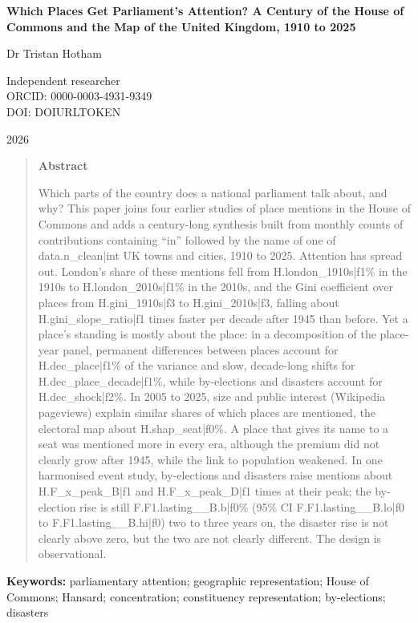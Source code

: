 \documentclass[11pt,a4paper]{article}
\begin{document}
\begin{center}
{\Large\bfseries Which Places Get Parliament's Attention? A Century of the House of Commons and the Map of the United Kingdom, 1910 to 2025\par}
\vspace{1.2em}
{\large Dr Tristan Hotham\par}
\vspace{0.3em}
{\small Independent researcher\\
ORCID: 0000-0003-4931-9349\\
DOI: DOIURLTOKEN\par}
\vspace{0.8em}
2026
\end{center}

\begin{quote}
\small
\begin{center}\textbf{Abstract}\end{center}
Which parts of the country does a national parliament talk about, and why? This paper joins four earlier studies of place mentions in the House of Commons and adds a century-long synthesis built from monthly counts of contributions containing ``in'' followed by the name of one of {{data.n_clean|int}} UK towns and cities, 1910 to 2025. Attention has spread out. London's share of these mentions fell from {{H.london_1910s|f1}}\% in the 1910s to {{H.london_2010s|f1}}\% in the 2010s, and the Gini coefficient over places from {{H.gini_1910s|f3}} to {{H.gini_2010s|f3}}, falling about {{H.gini_slope_ratio|f1}} times faster per decade after 1945 than before. Yet a place's standing is mostly about the place: in a decomposition of the place-year panel, permanent differences between places account for {{H.dec_place|f1}}\% of the variance and slow, decade-long shifts for {{H.dec_place_decade|f1}}\%, while by-elections and disasters account for {{H.dec_shock|f2}}\%. In 2005 to 2025, size and public interest (Wikipedia pageviews) explain similar shares of which places are mentioned, the electoral map about {{H.shap_seat|f0}}\%. A place that gives its name to a seat was mentioned more in every era, although the premium did not clearly grow after 1945, while the link to population weakened. In one harmonised event study, by-elections and disasters raise mentions about {{H.F_x_peak_B|f1}} and {{H.F_x_peak_D|f1}} times at their peak; the by-election rise is still {{F.F1.lasting__B.b|f0}}\% (95\% CI {{F.F1.lasting__B.lo|f0}} to {{F.F1.lasting__B.hi|f0}}) two to three years on, the disaster rise is not clearly above zero, but the two are not clearly different. The design is observational.
\end{quote}
\textbf{Keywords:} parliamentary attention; geographic representation; House of Commons; Hansard; concentration; constituency representation; by-elections; disasters
\end{document}

